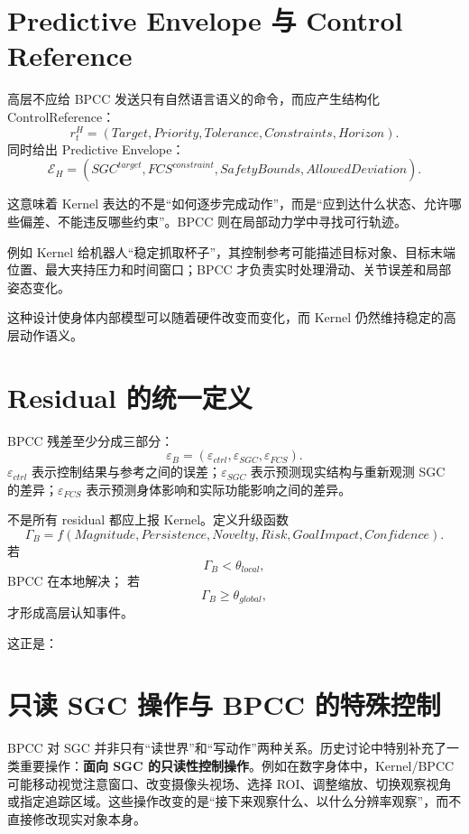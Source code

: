 \section{Predictive Envelope 与 Control Reference}

高层不应给 BPCC 发送只有自然语言语义的命令，而应产生结构化 ControlReference：
\[
r_t^H
=
(
Target,
Priority,
Tolerance,
Constraints,
Horizon
).
\]
同时给出 Predictive Envelope：
\[
\mathcal E_H
=
(
SGC^{target},
FCS^{constraint},
SafetyBounds,
AllowedDeviation
).
\]

这意味着 Kernel 表达的不是“如何逐步完成动作”，而是“应到达什么状态、允许哪些偏差、不能违反哪些约束”。BPCC 则在局部动力学中寻找可行轨迹。

例如 Kernel 给机器人“稳定抓取杯子”，其控制参考可能描述目标对象、目标末端位置、最大夹持压力和时间窗口；BPCC 才负责实时处理滑动、关节误差和局部姿态变化。

这种设计使身体内部模型可以随着硬件改变而变化，而 Kernel 仍然维持稳定的高层动作语义。

\section{Residual 的统一定义}

BPCC 残差至少分成三部分：
\[
\boxed{
\varepsilon_B
=
(
\varepsilon_{ctrl},
\varepsilon_{SGC},
\varepsilon_{FCS}
).
}
\]
$\varepsilon_{ctrl}$ 表示控制结果与参考之间的误差；$\varepsilon_{SGC}$ 表示预测现实结构与重新观测 SGC 的差异；$\varepsilon_{FCS}$ 表示预测身体影响和实际功能影响之间的差异。

不是所有 residual 都应上报 Kernel。定义升级函数
\[
\Gamma_B
=
f(
Magnitude,
Persistence,
Novelty,
Risk,
GoalImpact,
Confidence
).
\]
若
\[
\Gamma_B<\theta_{local},
\]
BPCC 在本地解决；
若
\[
\Gamma_B\geq\theta_{global},
\]
才形成高层认知事件。

这正是：
\begin{statementbox}
\centering
{}
\end{statementbox}

\section{只读 SGC 操作与 BPCC 的特殊控制}

BPCC 对 SGC 并非只有“读世界”和“写动作”两种关系。历史讨论中特别补充了一类重要操作：\textbf{面向 SGC 的只读性控制操作}。例如在数字身体中，Kernel/BPCC 可能移动视觉注意窗口、改变摄像头视场、选择 ROI、调整缩放、切换观察视角或指定追踪区域。这些操作改变的是“接下来观察什么、以什么分辨率观察”，而不直接修改现实对象本身。

